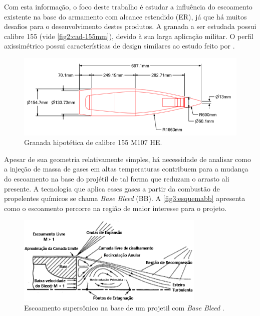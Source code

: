 Com esta informação, o foco deste trabalho é estudar a influência do escoamento existente na base do armamento com alcance estendido (ER), já que há muitos desafios para o desenvolvimento destes produtos. A granada a ser estudada possui calibre \qty{155}{\millimetre} (vide \autoref{fig2:cad-155mm}), devido à sua larga aplicação militar. O perfil axissimétrico possui características de design similares ao estudo feito por \citeauthor{Mahmoud2009}.

\begin{figure}[!ht]
	\centering
	\includegraphics[width=1.0\textwidth]{foto02-cad-155mm.png}
	\caption[Granada hipotética de calibre \qty{155}{\millimetre} M107 HE.]{Granada hipotética de calibre \qty{155}{\millimetre} M107 HE.}
	\label{fig2:cad-155mm}
\end{figure}

Apesar de sua geometria relativamente simples, há necessidade de analisar como a injeção de massa de gases em altas temperaturas contribuem para a mudança do escoamento na base do projétil de tal forma que reduzam o arrasto ali presente. A tecnologia que aplica esses gases a partir da combustão de propelentes químicos se chama \textit{Base Bleed} (BB). A \autoref{fig3:esquemabb} apresenta como o escoamento percorre na região de maior interesse para o projeto.

\begin{figure}[!ht]
	\centering
	\includegraphics[width=0.8\textwidth]{foto03-esquema-bb.png}
	\caption[Escoamento supersônico na base de um projetil com \textit{Base Bleed}.]{Escoamento supersônico na base de um projetil com \textit{Base Bleed} \cite{Mathur&Dutton1996}.}
	\label{fig3:esquemabb}
\end{figure}

